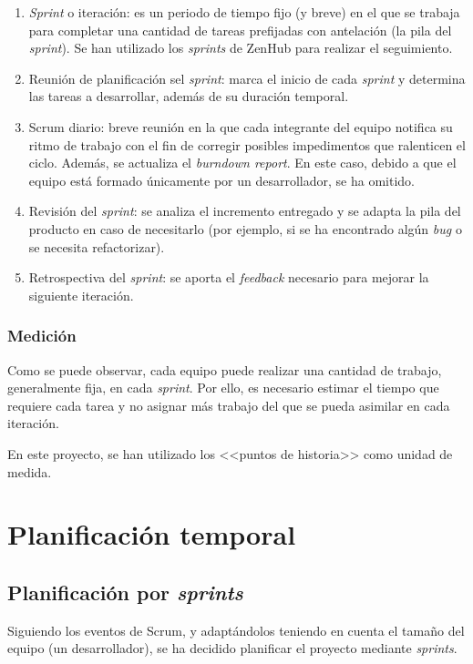 \begin{enumerate}
	\item \textit{Sprint} o iteración: es un periodo de tiempo fijo (y breve) en el que se trabaja para completar una cantidad de tareas prefijadas con antelación (la pila del \textit{sprint}). Se han utilizado los \textit{sprints} de ZenHub para realizar el seguimiento.
	\item Reunión de planificación sel \textit{sprint}: marca el inicio de cada \textit{sprint} y determina las tareas a desarrollar, además de su duración temporal.
	\item Scrum diario: breve reunión en la que cada integrante del equipo notifica su ritmo de trabajo con el fin de corregir posibles impedimentos que ralenticen el ciclo. Además, se actualiza el \textit{burndown report}. En este caso, debido a que el equipo está formado únicamente por un desarrollador, se ha omitido.
	\item Revisión del \textit{sprint}: se analiza el incremento entregado y se adapta la pila del producto en caso de necesitarlo (por ejemplo, si se ha encontrado algún \textit{bug} o se necesita refactorizar).
	\item Retrospectiva del \textit{sprint}: se aporta el \textit{feedback} necesario para mejorar la siguiente iteración.
\end{enumerate}

\subsubsection{Medición}

Como se puede observar, cada equipo puede realizar una cantidad de trabajo, generalmente fija, en cada \textit{sprint}. Por ello, es necesario estimar el tiempo que requiere cada tarea y no asignar más trabajo del que se pueda asimilar en cada iteración.

En este proyecto, se han utilizado los <<puntos de historia>> como unidad de medida.


\section{Planificación temporal}
\label{s:temp}

\subsection{Planificación por \textit{sprints}}
\label{s:planificacion-sprints}
Siguiendo los eventos de Scrum, y adaptándolos teniendo en cuenta el tamaño del equipo (un desarrollador), se ha decidido planificar el proyecto mediante \textit{sprints}.

